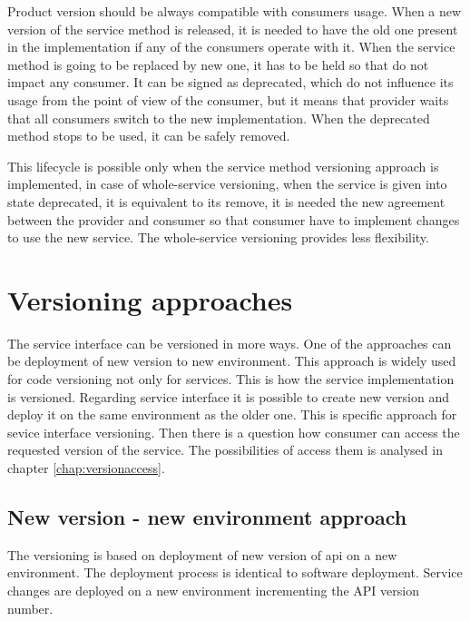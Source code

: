 Product version should be always compatible with consumers usage. When a new version of the service method is released, it is needed to have the old one present in the implementation if any of the consumers operate with it. When the service method is going to be replaced by new one, it has to be held so that do not impact any consumer. It can be signed as deprecated, which do not influence its usage from the point of view of the consumer, but it means that provider waits that all consumers switch to the new implementation. When the deprecated method stops to be used, it can be safely removed. 

This lifecycle is possible only when the service method versioning approach is implemented, in case of whole-service versioning, when the service is given into state deprecated, it is equivalent to its remove, it is needed the new agreement between the provider and consumer so that consumer have to implement changes to use the new service. %
The whole-service versioning provides less flexibility.


\section{Versioning approaches}
\label{sec:versioning-approaches}

The service interface can be versioned in more ways. One of the approaches can be deployment of new version to new environment. This approach is widely used for code versioning not only for services. This is how the service implementation is versioned. Regarding service interface it is possible to create new version and deploy it on the same environment as the older one. This is specific approach for sevice interface versioning. Then there is a question how consumer can access the requested version of the service. The possibilities of access them is analysed in chapter \ref{chap:versionaccess}.


\subsection{New version - new environment approach}

The versioning is based on deployment of new version of \gls{api} on a new environment. The deployment process is identical to software deployment. Service changes are deployed on a new environment incrementing the API version number.

